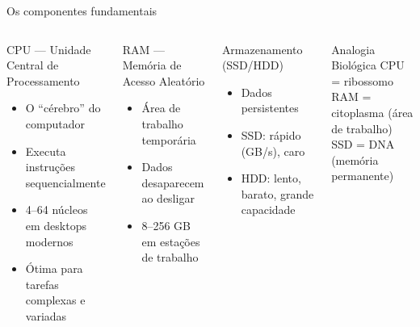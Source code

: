 \begin{frame}[shrink=15]{Os componentes fundamentais}
\begin{columns}
\begin{block}{CPU — Unidade Central de Processamento}
\begin{itemize}
    \item O ``cérebro'' do computador
    \item Executa instruções sequencialmente
    \item 4–64 núcleos em desktops modernos
    \item Ótima para tarefas complexas e variadas
\end{itemize}
\end{block}
\vspace{0.2cm}
\begin{block}{RAM — Memória de Acesso Aleatório}
\begin{itemize}
    \item Área de trabalho temporária
    \item Dados desaparecem ao desligar
    \item 8–256 GB em estações de trabalho
\end{itemize}
\end{block}

\begin{block}{Armazenamento (SSD/HDD)}
\begin{itemize}
    \item Dados persistentes
    \item SSD: rápido (GB/s), caro
    \item HDD: lento, barato, grande capacidade
\end{itemize}
\end{block}
\vspace{0.2cm}
\begin{exampleblock}{Analogia Biológica}
CPU = ribossomo\\
RAM = citoplasma (área de trabalho)\\
SSD = DNA (memória permanente)
\end{exampleblock}
\end{columns}
\end{frame}

